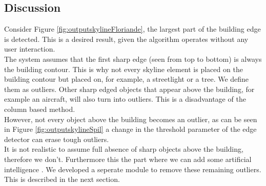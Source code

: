 \pagebreak



\subsection{Discussion}  %
Consider Figure \ref{fig:outputskylineFloriande}, the largest part of the
building edge is detected. This is a desired result, given the algorithm
operates without any user interaction.\\
The system assumes that the first sharp edge (seen from top to bottom) is always
the building contour. This is why not every skyline element is placed on the building
contour but placed on, for example, a streetlight or a tree. We define them
as outliers. Other sharp edged objects that appear above the building,
for example an aircraft, will also turn into outliers.  This is a disadvantage of the
	column based method.\\
However, not every object above the building becomes an outlier, as can be seen in Figure
\ref{fig:outputskylineSpil} a change in the threshold parameter of the edge
detector can erase tough outliers. \\
It is not realistic to assume full absence of sharp objects above the building,
therefore we don't. Furthermore this the part where we can add some artificial
intelligence . We developed a seperate module to remove these remaining
outliers. This is described in the next section.  



